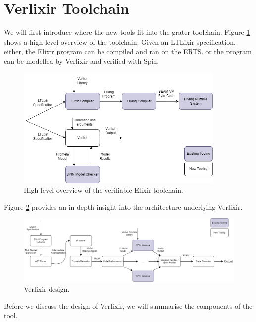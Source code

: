 \section{Verlixir Toolchain} \label{sec:toolchain}
We will first introduce where the new tools fit into the grater toolchain. Figure \ref{fig:high_level} shows a high-level overview of the toolchain. Given an LTLixir specification, either, the Elixir program can be compiled and ran on the ERTS, or the program can be modelled by Verlixir and verified with Spin.
\begin{figure}[H]
    \centering
    \includegraphics[width=0.9\textwidth]{images/high_level_system_v2.drawio.png}
    \caption{High-level overview of the verifiable Elixir toolchain.}
    \label{fig:high_level}
\end{figure}
Figure \ref{fig:low_level} provides an in-depth insight into the architecture underlying Verlixir.
\begin{figure}[H]
    \centering
    \includegraphics[width=1\textwidth]{images/detailed_diagram_v2.drawio.png}
    \caption{Verlixir design.}
    \label{fig:low_level}
\end{figure}
Before we discuss the design of Verlixir, we will summarise the components of the tool.

